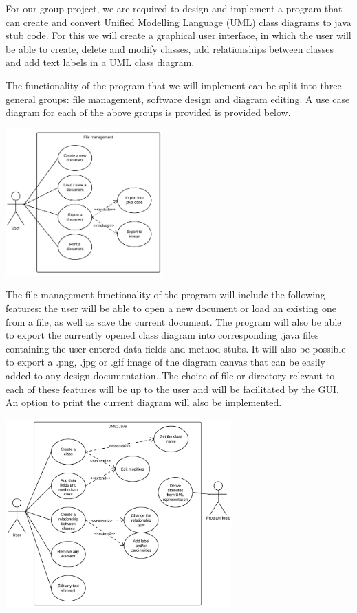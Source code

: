 
\tab For our group project, we are required to design and implement a program that can create and convert Unified Modelling Language (UML) class diagrams to java stub code. For this we will create a graphical user interface, in which the user will be able to create, delete and modify classes, add relationships between classes and add text labels in a UML class diagram. 

The functionality of the program that we will implement can be split into three general groups: file management, software design and diagram editing. A use case diagram for each of the above groups is provided is provided below. 

\vspace{-10pt}
\begin{center}
	\includegraphics[width=0.45\textwidth]{FileManagementUseCaseDiagram.png}
\end{center}
\vspace{-10pt}

The file management functionality of the program will include the following features: the user will be able to open a new document or load an existing one from a file, as well as save the current document. The program will also be able to export the currently opened class diagram into corresponding .java files containing the user-entered data fields and method stubs. It will also be possible to export a .png, .jpg or .gif image of the diagram canvas that can be easily added to any design documentation. The choice of file or directory relevant to each of these features will be up to the user and will be facilitated by the GUI. An option to print the current diagram will also be implemented.

\vspace{-10pt} 
\begin{center}
	\includegraphics[width=0.65\textwidth]{SoftwareDesignUseCaseDiagram.png}
\end{center}
\vspace{-10pt}

